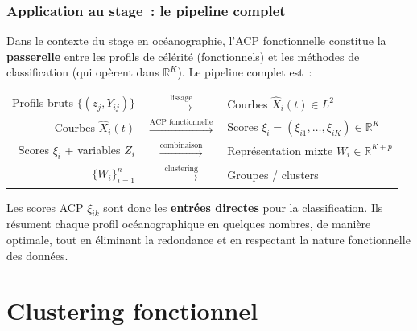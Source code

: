 \documentclass[11pt, a4paper]{article}
\newcommand{\R}{\mathbb{R}}
\begin{document}
\section{Application au stage~: le pipeline complet}

Dans le contexte du stage en oc\'eanographie, l'ACP fonctionnelle constitue la \textbf{passerelle} entre les profils de c\'el\'erit\'e (fonctionnels) et les m\'ethodes de classification (qui op\`erent dans $\R^K$). Le pipeline complet est~:

\medskip
\begin{center}
\begin{tabular}{rcl}
    Profils bruts $\{(z_j, Y_{ij})\}$ & $\xrightarrow{\text{lissage}}$ & Courbes $\hat{X}_i(t) \in L^2$ \\
    Courbes $\hat{X}_i(t)$ & $\xrightarrow{\text{ACP fonctionnelle}}$ & Scores $\xi_i = (\xi_{i1}, \ldots, \xi_{iK}) \in \R^K$ \\
    Scores $\xi_i$ + variables $Z_i$ & $\xrightarrow{\text{combinaison}}$ & Repr\'esentation mixte $W_i \in \R^{K+p}$ \\
    $\{W_i\}_{i=1}^n$ & $\xrightarrow{\text{clustering}}$ & Groupes / clusters \\
\end{tabular}
\end{center}

\medskip
Les scores ACP $\xi_{ik}$ sont donc les \textbf{entr\'ees directes} pour la classification. Ils r\'esument chaque profil oc\'eanographique en quelques nombres, de mani\`ere optimale, tout en \'eliminant la redondance et en respectant la nature fonctionnelle des donn\'ees.

\newpage


\part*{Clustering fonctionnel}

\end{document}

